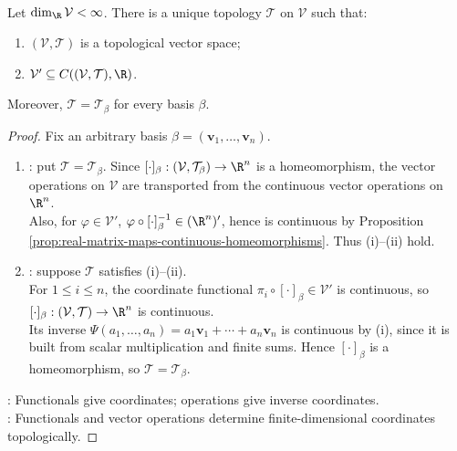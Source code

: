 \begin{theorem} \label{thm:natural-topology-characterization} \\
Let $\dim_{\R}\mathcal{V}<\infty$. There is a unique topology $\mathcal{T}$ on $\mathcal{V}$ such that:
\begin{enumerate}[label=(\roman*)]
\setlength{\itemsep}{0pt}
\item $(\mathcal{V},\mathcal{T})$ is a topological vector space;
\item $\mathcal{V}'\subseteq C((\mathcal{V},\mathcal{T}),\R)$.
\end{enumerate}
Moreover, $\mathcal{T}=\mathcal{T}_{\beta}$ for every basis $\beta$.
\begin{proof}
Fix an arbitrary basis $\beta=(\mathbf{v}_1,\ldots,\mathbf{v}_n)$.
\begin{enumerate}[label=(\roman*)]
\setlength{\itemsep}{0pt}
\item {}: put $\mathcal{T}=\mathcal{T}_{\beta}$. Since $[\cdot]_{\beta}:(\mathcal{V},\mathcal{T}_{\beta})\to\R^n$ is a homeomorphism, the vector operations on $\mathcal{V}$ are transported from the continuous vector operations on $\R^n$.\\
Also, for $\varphi\in\mathcal{V}'$, $\varphi\circ[\cdot]_{\beta}^{-1}\in(\R^n)'$, hence is continuous by Proposition \ref{prop:real-matrix-maps-continuous-homeomorphisms}. Thus (i)--(ii) hold.
\item {}: suppose $\mathcal{T}$ satisfies (i)--(ii).\\
For $1\leq i\leq n$, the coordinate functional $\pi_i\circ[\cdot]_{\beta}\in\mathcal{V}'$ is continuous, so $[\cdot]_{\beta}:(\mathcal{V},\mathcal{T})\to\R^n$ is continuous.\\
Its inverse $\Psi(a_1,\ldots,a_n)=a_1\mathbf{v}_1+\cdots+a_n\mathbf{v}_n$ is continuous by (i), since it is built from scalar multiplication and finite sums. Hence $[\cdot]_{\beta}$ is a homeomorphism, so $\mathcal{T}=\mathcal{T}_{\beta}$.
\end{enumerate}
: Functionals give coordinates; operations give inverse coordinates.\\
: Functionals and vector operations determine finite-dimensional coordinates topologically.
\end{proof}
\end{theorem}

